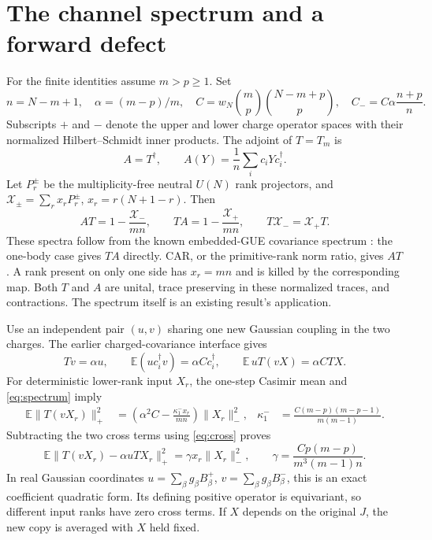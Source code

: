 \documentclass[11pt,a4paper]{article}
\newcommand{\EE}{\mathbb E}
\newcommand{\XX}{\mathscr X}
\begin{document}
\newpage
\section{The channel spectrum and a forward defect}
For the finite identities assume $m>p\ge1$. Set
\begin{equation}
 n=N-m+1,\quad \alpha=(m-p)/m,\quad
 C=w_N\binom mp\binom{N-m+p}p,\quad
 C_-=C\alpha\frac{n+p}{n}.
\end{equation}
Subscripts $+$ and $-$ denote the upper and lower charge operator
spaces with their normalized Hilbert--Schmidt inner products. The
adjoint of $T=T_m$ is
\begin{equation}
 A=T^\dagger,\qquad A(Y)=\frac1n\sum_i c_iYc_i^\dagger.
\end{equation}
Let $P_r^\pm$ be the multiplicity-free neutral $U(N)$ rank projectors,
and $\XX_\pm=\sum_r x_rP_r^\pm$, $x_r=r(N+1-r)$. Then
\begin{equation}
 AT=1-\frac{\XX_-}{mn},\qquad
 TA=1-\frac{\XX_+}{mn},\qquad T\XX_-=\XX_+T.
 \label{eq:spectrum}
\end{equation}
These spectra follow from the known embedded-GUE covariance spectrum
\cite{Kota}: the one-body case gives $TA$ directly. CAR, or the
primitive-rank norm ratio, gives $AT$. A rank present on only one
side has $x_r=mn$ and is killed by the corresponding map. Both
$T$ and $A$ are unital, trace preserving in these normalized traces,
and contractions. The spectrum itself is an existing result's application.

Use an independent pair $(u,v)$ sharing one new Gaussian coupling
in the two charges. The earlier charged-covariance interface gives
\begin{equation}
 Tv=\alpha u,\qquad \EE(uc_i^\dagger v)=\alpha Cc_i^\dagger,
 \qquad \EE\,uT(vX)=\alpha C TX.
 \label{eq:cross}
\end{equation}
For deterministic lower-rank input $X_r$, the one-step Casimir mean
and \eqref{eq:spectrum} imply
\begin{align}
 \EE\|T(vX_r)\|_+^2
 &=\left(\alpha^2C-\frac{\kappa_1^-x_r}{mn}\right)\|X_r\|_-^2,
 &\kappa_1^-&=\frac{C(m-p)(m-p-1)}{m(m-1)}.
\end{align}
Subtracting the two cross terms using \eqref{eq:cross} proves
\begin{equation}
 \boxed{\ \EE\|T(vX_r)-\alpha uTX_r\|_+^2
 =\gamma x_r\|X_r\|_-^2,\qquad
 \gamma=\frac{Cp(m-p)}{m^3(m-1)n}.\ }
 \label{eq:forward}
\end{equation}
In real Gaussian coordinates $u=\sum_\beta g_\beta B_\beta^+$,
$v=\sum_\beta g_\beta B_\beta^-$, this is an exact coefficient
quadratic form. Its defining positive operator is equivariant, so
different input ranks have zero cross terms. If $X$ depends on the
original $J$, the new copy is averaged with $X$ held fixed.
\end{document}
